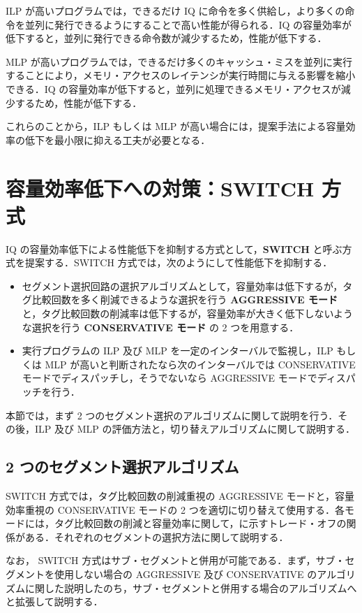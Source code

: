 ILP が高いプログラムでは，できるだけ IQ に命令を多く供給し，より多くの命令を並列に発行できるようにすることで高い性能が得られる．IQ の容量効率が低下すると，並列に発行できる命令数が減少するため，性能が低下する．

MLP が高いプログラムでは，できるだけ多くのキャッシュ・ミスを並列に実行することにより，メモリ・アクセスのレイテンシが実行時間に与える影響を縮小できる．IQ の容量効率が低下すると，並列に処理できるメモリ・アクセスが減少するため，性能が低下する．

これらのことから，ILP もしくは MLP が高い場合には，提案手法による容量効率の低下を最小限に抑える工夫が必要となる．

\section{容量効率低下への対策：SWITCH 方式}
\label{sec:switch_scheme}
IQ の容量効率低下による性能低下を抑制する方式として，\textbf{SWITCH} と呼ぶ方式を提案する．SWITCH 方式では，次のようにして性能低下を抑制する．
\begin{itemize}
  \item セグメント選択回路の選択アルゴリズムとして，容量効率は低下するが，タグ比較回数を多く削減できるような選択を行う \textbf{AGGRESSIVE モード} と，タグ比較回数の削減率は低下するが，容量効率が大きく低下しないような選択を行う \textbf{CONSERVATIVE モード} の 2 つを用意する．
  \item 実行プログラムの ILP 及び MLP を一定のインターバルで監視し，ILP もしくは MLP が高いと判断されたなら次のインターバルでは CONSERVATIVE モードでディスパッチし，そうでないなら AGGRESSIVE モードでディスパッチを行う．
\end{itemize}

本節では，まず 2 つのセグメント選択のアルゴリズムに関して説明を行う．その後，ILP 及び MLP の評価方法と，切り替えアルゴリズムに関して説明する．

\subsection{2 つのセグメント選択アルゴリズム}
\label{sec:two_mode}
SWITCH 方式では，タグ比較回数の削減重視の AGGRESSIVE モードと，容量効率重視の CONSERVATIVE モードの 2 つを適切に切り替えて使用する．各モードには，タグ比較回数の削減と容量効率に関して，に示すトレード・オフの関係がある．それぞれのセグメントの選択方法に関して説明する．

なお， SWITCH 方式はサブ・セグメントと併用が可能である．まず，サブ・セグメントを使用しない場合の AGGRESSIVE 及び CONSERVATIVE のアルゴリズムに関した説明したのち，サブ・セグメントと併用する場合のアルゴリズムへと拡張して説明する．

